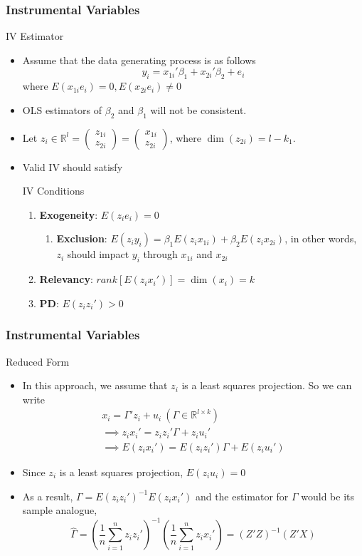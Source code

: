 \documentclass{beamer}
\begin{document}
\begin{frame}
\frametitle{Instrumental Variables}
IV Estimator
\begin{itemize}
\item Assume that the data generating process is as follows
\[
y_i = x_{1i}'\beta_1+x_{2i}'\beta_2+e_i
\]
where $E(x_{1i}e_i)=0, E(x_{2i}e_i)\neq0$
\item OLS estimators of $\beta_2$ and $\beta_1$ will not be consistent.
\item Let $z_i\in\mathbb{R}^l = \begin{pmatrix}z_{1i} \\ z_{2i}\end{pmatrix}=\begin{pmatrix}x_{1i} \\ z_{2i}\end{pmatrix}$, where $\dim(z_{2i})=l-k_1$.
\item Valid IV should satisfy
\begin{block}{IV Conditions}
\begin{enumerate}
\item \textbf{Exogeneity}: $E(z_ie_i)=0$
\begin{enumerate}
\item \textbf{Exclusion}: $E(z_iy_i)=\beta_1E(z_ix_{1i})+\beta_2E(z_ix_{2i})$, in other words, $z_i$ should impact $y_i$ through $x_{1i}$ and $x_{2i}$
\end{enumerate}
\item \textbf{Relevancy}: $rank[E(z_ix_i')]=\dim(x_i)=k$
\item \textbf{PD}: $E(z_iz_i')>0$
\end{enumerate}
\end{block}
\end{itemize}
\end{frame}

\begin{frame}
\frametitle{Instrumental Variables}
Reduced Form
\begin{itemize}
\item In this approach, we assume that $z_i$ is a least squares projection. So we can write
\begin{gather*}
x_i = \Gamma'z_i+u_i \ (\Gamma\in\mathbb{R}^{l\times k})\\
\implies z_ix_i'=z_iz_i'\Gamma+z_iu_i'\\
\implies E(z_ix_i')=E(z_iz_i')\Gamma+E(z_iu_i')
\end{gather*}
\item Since $z_i$ is a least squares projection, $E(z_iu_i)=0$
\item As a result, $\Gamma= E(z_iz_i')^{-1}E(z_ix_i')$ and the estimator for $\Gamma$ would be its sample analogue, 
\[
\widehat{\Gamma}=\left(\frac{1}{n}\sum_{i=1}^nz_iz_i'\right)^{-1}\left(\frac{1}{n}\sum_{i=1}^nz_ix_i'\right)=(Z'Z)^{-1}(Z'X)
\]
\end{itemize}
\end{frame}
\end{document}
